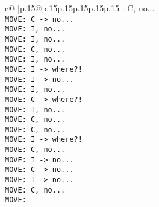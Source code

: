 \documentclass{article}
\begin{document}
{\begin{supertabular}{c@{$\;$}|p{.15\linewidth}@{}p{.15\linewidth}p{.15\linewidth}p{.15\linewidth}p{.15\linewidth}p{.15\linewidth}}
{{{: C, no...\\ \tt  MOVE: C -> no...\\ \tt  MOVE: I, no...\\ \tt  MOVE: I, no...\\ \tt  MOVE: C, no...\\ \tt  MOVE: I, no...\\ \tt  MOVE: I -> where?!\\ \tt  MOVE: I -> no...\\ \tt  MOVE: I, no...\\ \tt  MOVE: C -> where?!\\ \tt  MOVE: I, no...\\ \tt  MOVE: C, no...\\ \tt  MOVE: C, no...\\ \tt  MOVE: I -> where?!\\ \tt  MOVE: C, no...\\ \tt  MOVE: I -> no...\\ \tt  MOVE: C -> no...\\ \tt  MOVE: I -> no...\\ \tt  MOVE: C, no...\\ \tt  MOVE:}}}
\end{supertabular}}
\end{document}
